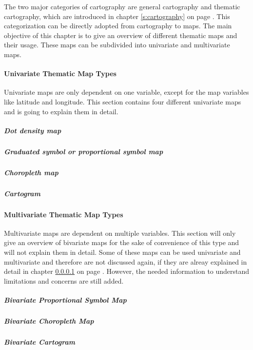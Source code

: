 The two major categories of cartography are general cartography and thematic cartography, which are introduced in chapter \ref{s:cartography} on page \pageref{s:cartography}. This categorization can be directly adopted from cartography to maps. The main objective of this chapter is to give an overview of different thematic maps and their usage. These maps can be subdivided into univariate and multivariate maps.

\paragraph{Univariate Thematic Map Types}
\label{s:univariate-maps}

Univariate maps are only dependent on one variable, except for the map variables like latitude and longitude. This section contains four different univariate maps and is going to explain them in detail.

\subparagraph{Dot density map}
\label{s:dot}


\subparagraph{Graduated symbol or proportional symbol map}


\subparagraph{Choropleth map}

\label{s:choropleth}

\subparagraph{Cartogram}


\paragraph{Multivariate Thematic Map Types}
Multivariate maps are dependent on multiple variables. This section will only give an overview of bivariate maps for the sake of convenience of this type and will not explain them in detail. Some of these maps can be used univariate and multivariate and therefore are not discussed again, if they are alreay explained in detail in chapter \ref{s:univariate-maps} on page \pageref{s:univariate-maps}. However, the needed information to understand limitations and concerns are still added.

\subparagraph{Bivariate Proportional Symbol Map}


\subparagraph{Bivariate Choropleth Map}


\subparagraph{Bivariate Cartogram}
